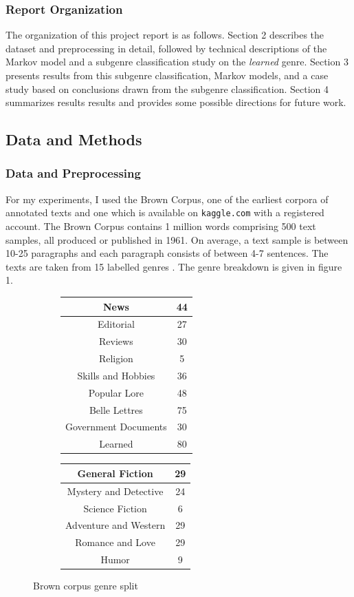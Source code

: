 \documentclass[12pt, titlepage]{article}
\begin{document}
\subsubsection{Report Organization}
The organization of this project report is as follows. Section 2 describes the dataset and preprocessing in detail, followed by technical descriptions of the Markov model and a subgenre classification study on the \textit{learned} genre. Section 3 presents results from this subgenre classification, Markov models, and a case study based on conclusions drawn from the subgenre classification. Section 4 summarizes results results and provides some possible directions for future work.

\subsection{Data and Methods}
\subsubsection{Data and Preprocessing}
For my experiments, I used the Brown Corpus, one of the earliest corpora of annotated texts and one which is available on \verb|kaggle.com| with a registered account. The Brown Corpus contains 1 million words comprising 500 text samples, all produced or published in 1961. On average, a text sample is between 10-25 paragraphs and each paragraph consists of between 4-7 sentences. The texts are taken from 15 labelled genres \cite{BrownManual}. The genre breakdown is given in figure 1.
\begin{figure}[ht!]
\centering
\begin{subfigure}[T]{0.4\linewidth}
\begin{tabular}{|c|c|}
\hline
News & 44\\
\hline
Editorial & 27\\
\hline
Reviews & 30\\
\hline
Religion & 5\\
\hline
Skills and Hobbies & 36\\
\hline
Popular Lore & 48\\
\hline
Belle Lettres & 75\\
\hline
Government Documents & 30\\
\hline
Learned & 80\\
\hline
\end{tabular}
\end{subfigure}
\begin{subfigure}[T]{0.4\linewidth}
\begin{tabular}{|c|c|}
\hline
General Fiction & 29\\
\hline
Mystery and Detective & 24\\
\hline
Science Fiction & 6\\
\hline
Adventure and Western & 29\\
\hline
Romance and Love & 29\\
\hline
Humor & 9\\
\hline
\end{tabular}
\end{subfigure}
\caption{Brown corpus genre split}
\end{figure}
\end{document}
